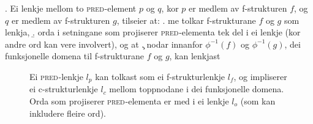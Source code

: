 \documentclass[12pt,a4paper,oneside,draft]{report}
\newcommand{\F}[2]{\textsc{#1}\ensuremath{_{#2}}}
\newcommand{\PRED}{\F{pred}{}}
\newcommand{\proj}[2]{\begin{tabular}{c}\footnotesize{#1}\\\normalsize{#2}\end{tabular}}
\newcommand{\ua}{\ensuremath{\uparrow}}
\newcommand{\da}{\ensuremath{\downarrow}}
\begin{document}
\ex. \label{krav:f-links} Ei lenkje mellom to \PRED{}-element $p$ og $q$, kor
      $p$ er medlem av f-strukturen $f$, og $q$ er medlem av
      f-strukturen $g$, tilseier at:
\a. \label{krav:f-links-substr} me tolkar f-strukturane $f$ og $g$ som lenkja,
\b. \label{krav:f-links-words} orda i setningane som projiserer
     \PRED{}-elementa tek del i ei lenkje (kor andre
     ord kan vere involvert), og at
\c. \label{krav:f-links-domain} nodar innanfor $\phi^{-1}(f)$
     og $\phi^{-1}(g)$, dei funksjonelle domena til f-strukturane $f$
     og $g$, kan lenkjast

 \begin{figure}[htp]
    \centering
    
    \caption{Ei \PRED{}-lenkje $l_p$ kan tolkast som ei f-strukturlenkje
    $l_f$, og impliserer ei c-strukturlenkje $l_c$ mellom toppnodane i
    dei funksjonelle domena. Orda som projiserer \PRED{}-elementa er med
    i ei lenkje $l_o$ (som kan inkludere fleire ord).}
   \label{fig:viss-PRED-så-f-og-c}
 \end{figure}
\end{document}
